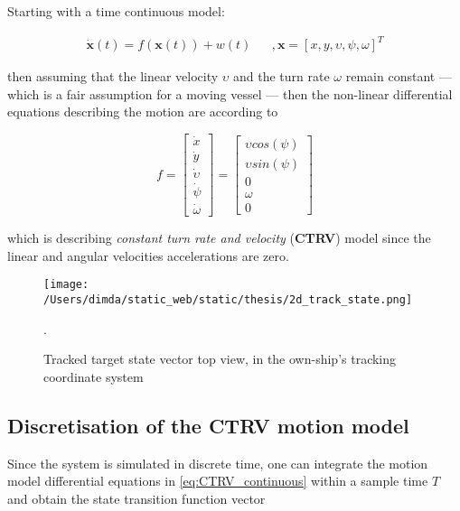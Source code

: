 Starting with a time continuous model:

\begin{equation}
\begin{aligned}\dot{\mathbf{x}}(t) = f(\mathbf{x}(t)) + w(t) &&,\mathbf{x} = \left[x,y,\upsilon, \psi,\omega\right]^{T}  \end{aligned}
\end{equation}


then assuming that the linear velocity $\upsilon$ and the turn rate $\omega$ remain constant  --- which is a fair assumption for a moving vessel --- then the non-linear differential equations describing the motion are according to \cite{Schubert2008}

\begin{equation}\label{eq:CTRV_continuous}
f =\begin{bmatrix}\dot{x} \\ \dot{y} \\ \dot{\upsilon} \\ \dot{\psi} \\ \dot{\omega}  \end{bmatrix}=  \begin{bmatrix}\upsilon cos(\psi) \\ \upsilon sin(\psi) \\ 0 \\ \omega \\ 0  \end{bmatrix}
\end{equation}

which is describing  \emph{constant turn rate and velocity} (\textbf{CTRV}) model since the linear and angular velocities accelerations are zero.


\begin{figure}[H]
	\centering
	\texttt{[image: /Users/dimda/static\_web/static/thesis/2d\_track\_state.png]}
	\caption{Tracked target state vector top view, in the own-ship's tracking coordinate system}.
	\label{fig:state_vector}
\end{figure}

\subsection{Discretisation of the CTRV motion model}

Since the system is simulated in discrete time, one can integrate the motion model differential equations in \cref{eq:CTRV_continuous} within a sample time $T$ and obtain the state transition function vector


